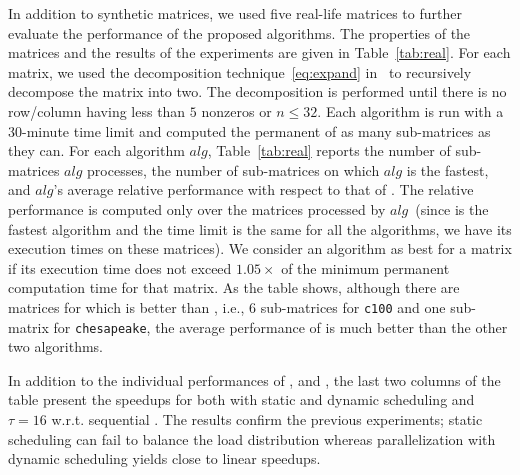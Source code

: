 \documentclass{elektr}
\begin{document}
{In addition to synthetic matrices, we used five real-life matrices to further evaluate the performance of the proposed algorithms. The properties of the matrices and the results of the experiments are given in Table~\ref{tab:real}. 
For each matrix, we used the decomposition technique~\eqref{eq:expand} in~\cite{forbert03, liang06} to recursively decompose the matrix into two. The decomposition is performed until there is no row/column having less than $5$ nonzeros or $n \leq 32$. Each algorithm is run with a 30-minute time limit and computed the permanent of as many sub-matrices as they can. For each algorithm $alg$, Table~\ref{tab:real} reports the number of sub-matrices $alg$ processes, the number of sub-matrices on which $alg$ is the fastest, and $alg$'s average relative performance with respect to that of {}. The relative performance is computed only over the matrices processed by $alg$~(since {} is the fastest algorithm and the time limit is the same for all the algorithms, we have its execution times on these matrices). We consider an algorithm as best for a matrix if its execution time does not exceed $1.05\times$ of the minimum permanent computation time for that matrix. As the table shows, although there are matrices for which {} is better than {}, i.e., $6$ sub-matrices for {\tt c100} and one sub-matrix for {\tt chesapeake}, the average performance of {} is much better than the other two algorithms. 

In addition to the individual performances of {}, {} and {}, the last two columns of the table present the speedups for  {} both with static and dynamic scheduling and  $\tau = 16$ w.r.t. sequential {}. The results confirm the previous experiments; static scheduling can fail to balance the load distribution whereas parallelization with dynamic scheduling yields close to linear speedups. 
 
}
\end{document}
